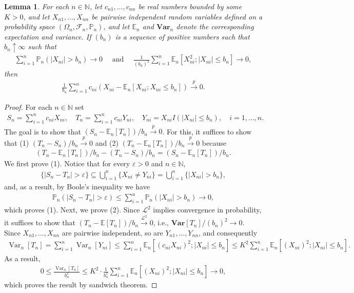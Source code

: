 \documentclass[11pt]{article}
\def\mc#1{\mathcal{#1}} %
\def\E{\mathbb{E}} %
\def\mc#1{\mathcal{#1}}
\def\var#1{\mathrm{Var}(#1)} %
\def\P{\mathbb{P}}
\def\var{\mathbf{Var}}
\def\naturals{\mathbb{N}}
\def\cp{\overset{p}{\to}}
\def\clt{\overset{\mathcal{L}^2}{\to}}
\DeclareMathOperator{\Var}{Var} %
\newtheorem{lem}{Lemma}
\theoremstyle{definition}
\begin{document}
\begin{lem}
  \label{gwlln}  For each $n\in \naturals$, let $c_{n1}, \ldots, c_{nn}$ be real numbers bounded by some $K > 0$, and let $X_{n1}, \ldots, X_{nn}$ be pairwise independent random variables defined on a probability space $(\Omega_n, \mc{F}_n, \P_n)$, and let $\E_n$ and $\var_n$ denote the corresponding expectation and variance. If $(b_n)$ is a sequence of positive numbers such that $b_n \uparrow \infty$ such that
    \begin{align*}
      \sum_{i=1}^n \P_n (|X_{ni}| > b_n) \to 0
      \quad \text{ and } 
      \quad \frac{1}{(b_n)^2} \sum_{i=1}^n \E_n[X_{ni}^2; |X_{ni}|\leq b_n] \to 0,
    \end{align*}
    then
    \begin{align*}
      \frac{1}{b_n} \sum_{i=1}^n c_{ni} (X_{ni} - \E_n[X_{ni}; X_{ni} \leq b_n]) \cp 0.
    \end{align*}
\end{lem}

\begin{proof}
  For each $n\in \naturals$ set
    \begin{align*}
      S_n = \sum_{i=1}^n c_{ni} X_{ni}, \quad T_n = \sum_{i=1}^n c_{ni} Y_{ni},
      \quad Y_{ni} = X_{ni} I(|X_{ni}|\leq b_n), \quad i = 1, \ldots, n.
    \end{align*}
   The goal is to show that  $(S_n- \E_n[T_n])/b_n \cp 0$. For this, it suffices to show that (1) $(T_n - S_n)/b_n \cp 0$ and (2) $(T_n - \E_n[T_n])/b_n \cp 0$ because
    \begin{align*}
      (T_n - \E_n[T_n])/b_n -(T_n - S_n)/b_n = (S_n- \E_n[T_n])/b_n .
    \end{align*}
     We first prove (1). Notice that for every $\varepsilon > 0$ and $n\in \naturals$,
    \begin{align*}
      \{|S_n- T_n| > \varepsilon\}\subseteq \bigcup_{i=1}^n \{X_{ni}\neq Y_{ni}\}
      = \bigcup_{i=1}^n \{|X_{ni}|>b_n\},
    \end{align*}
    and, as a result, by Boole's inequality we have
    \begin{align*}
      \P_n (|S_n - T_n|>\varepsilon) \leq \sum_{i=1}^n \P_n(|X_{ni}|>b_n) \to 0,
    \end{align*}
    which proves (1). Next, we prove (2). Since $\mc{L}^2$ implies convergence in probability, it suffices to show that $(T_n-\E[T_n])/b_n \clt 0$, i.e., $\var[T_n]/(b_n)^2 \to 0$. Since $X_{n1}, \ldots, X_{nn}$ are pairwise independent, so are $Y_{n1}, \ldots, Y_{nn}$, and consequently
    \begin{align*}
      \Var_n[T_n]=\sum_{i=1}^n \Var_n[Y_{ni}] \leq \sum_{i=1}^n \E_n[(c_{ni}X_{ni})^2; |X_{ni}|\leq b_n] \leq K^2\sum_{i=1}^n \E_n[(X_{ni})^2; |X_{ni}|\leq b_n].
    \end{align*}
    As a result,
    \begin{align*}
    0\leq   \frac{\Var_n[T_n]}{b_n^2}\leq K^2 \cdot  \frac{1}{b_n^2}\sum_{i=1}^n \E_n[(X_{ni})^2; |X_{ni}|\leq b_n] \to 0,
    \end{align*}
    which proves the result by sandwich theorem.
\end{proof}
\end{document}
